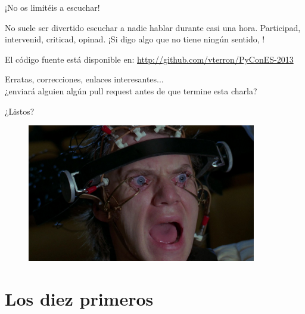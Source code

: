 \documentclass[14pt]{beamer}
\begin{document}
\begin{frame}{¡No os limitéis a escuchar!}
  \begin{center}
    No suele ser divertido escuchar a nadie hablar durante casi una
    hora. Participad, intervenid, criticad, opinad. ¡Si digo algo que
    no tiene ningún sentido, !
  \end{center}

  \begin{block}{\centering El código fuente está disponible en:}
    \centering \url{http://github.com/vterron/PyConES-2013}
  \end{block}

  \begin{center}
    \small Erratas, correcciones, enlaces interesantes...\\ ¿enviará
    alguien algún pull request antes de que termine esta charla?
  \end{center}
\end{frame}

\begin{frame}{}
  \begin{alertblock}{}
    \centering \Large ¿Listos?
  \end{alertblock}

  \begin{figure}
    \centering
    \includegraphics[height=6cm]{pics/a-clockwork-orange.jpg}
  \end{figure}
\end{frame}

\section{Los diez primeros}











\end{document}
